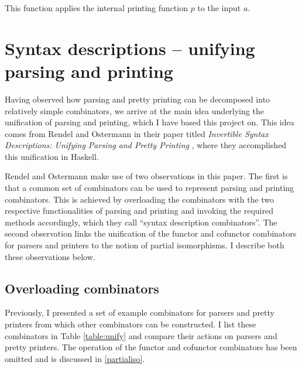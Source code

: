 \documentclass[12pt,a4paper,twoside,openright]{report}
\begin{document}
This function applies the internal printing function $p$ to the input $a$.

\section{Syntax descriptions -- unifying parsing and printing} \label{unify}

Having observed how parsing and pretty printing can be decomposed into relatively simple combinators, we arrive at the main idea underlying the unification of parsing and printing, which I have based this project on. This idea comes from Rendel and Ostermann in their paper titled \emph{Invertible Syntax Descriptions: Unifying Parsing and Pretty Printing} \cite{invert}, where they accomplished this unification in Haskell.

Rendel and Ostermann make use of two observations in this paper. The first is that a common set of combinators can be used to represent parsing and printing combinators. This is achieved by overloading the combinators with the two respective functionalities of parsing and printing and invoking the required methods accordingly, which they call ``syntax description combinators''. The second observation links the unification of the functor and cofunctor combinators for parsers and printers to the notion of partial isomorphisms. I describe both these observations below.

\subsection{Overloading combinators} \label{overload}

Previously, I presented a set of example combinators for parsers and pretty printers from which other combinators can be constructed.
I list these combinators in Table \ref{table:unify} and compare their actions on parsers and pretty printers. The operation of the functor and cofunctor combinators has been omitted and is discussed in \autoref{partialiso}.
\end{document}
